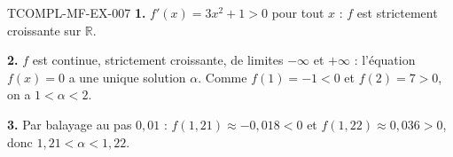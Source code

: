 \begin{corrige}{TCOMPL-MF-EX-007}
\textbf{1.} $f'(x)=3x^2+1>0$ pour tout $x$ : $f$ est strictement croissante
sur $\mathbb{R}$.

\textbf{2.} $f$ est continue, strictement croissante, de limites $-\infty$ et
$+\infty$ : l'équation $f(x)=0$ a une unique solution $\alpha$. Comme
$f(1)=-1<0$ et $f(2)=7>0$, on a $1<\alpha<2$.

\textbf{3.} Par balayage au pas $0{,}01$ : $f(1{,}21)\approx-0{,}018<0$ et
$f(1{,}22)\approx0{,}036>0$, donc $1{,}21<\alpha<1{,}22$.
\end{corrige}
